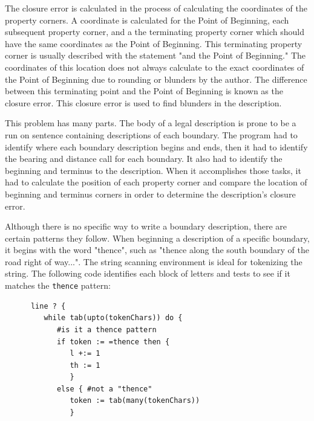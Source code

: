 \documentclass{article}
\begin{document}
The closure error is calculated in the process of calculating the coordinates of the property corners.  A coordinate is calculated for the Point of Beginning, each subsequent property corner, and a the terminating property corner which should have the same coordinates as the Point of Beginning.  This terminating property corner is usually described with the statement "and the Point of Beginning."  The coordinates of this location does not always calculate to the exact coordinates of the Point of Beginning due to rounding or blunders by the author.  The difference between this terminating point and the Point of Beginning is known as the closure error.  This closure error is used to find blunders in the description.

This problem has many parts.  The body of a legal description is prone to be a run on sentence containing descriptions of each boundary.  The program had to identify where each boundary description begins and ends, then it had to identify the bearing and distance call for each boundary.  It also had to identify the beginning and terminus to the description.  When it accomplishes those tasks, it had to calculate the position of each property corner and compare the location of beginning and terminus corners in order to determine the description's closure error.

Although there is no specific way to write a boundary description, there are certain patterns they follow.  When beginning a description of a specific boundary, it begins with the word "thence", such as "thence along the south boundary of the road right of way...".  The string scanning environment is ideal for tokenizing the string.  The following code identifies each block of letters and tests to see if it matches the \texttt{thence} pattern:\\
\begin{verbatim}
      line ? {
         while tab(upto(tokenChars)) do {
            #is it a thence pattern
            if token := =thence then { 
               l +:= 1
               th := 1
               }
            else { #not a "thence"
               token := tab(many(tokenChars))
               }
\end{verbatim}  
\end{document}
